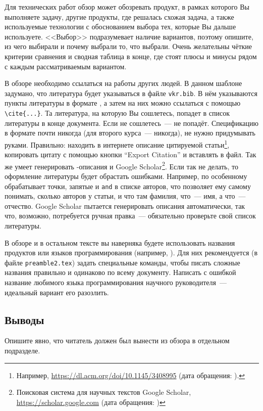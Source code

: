 Для технических работ обзор может обозревать продукт, в рамках которого Вы выполняете задачу, другие продукты, где решалась схожая задача, а также используемые технологии с обоснованием выбора тех, которые Вы дальше используете. <<Выбор>> подразумевает наличие вариантов, поэтому опишите, из чего выбирали и почему выбрали то, что выбрали. Очень желательны чёткие критерии сравнения и сводная таблица в конце, где стоят плюсы и минусы рядом с каждым рассматриваемым вариантом.

В обзоре необходимо ссылаться на работы других людей. В данном шаблоне задумано, что литература будет указываться в файле \verb=vkr.bib=. В нём указываются пункты литературы в формате \BibTeX{}, а затем на них можно ссылаться с помощью \verb=\cite{...}=. Та литература, на которую Вы сошлетесь, попадет в список литературы в конце документа. Если не сошлетесь~---  не попадёт. Спецификацию в формате \BibTeX{} почти никогда (для второго курса~--- никогда), не нужно придумывать руками. Правильно: находить в интернете описание цитируемой статьи\footnote{Например, \url{https://dl.acm.org/doi/10.1145/3408995} (дата обращения: ).},
копировать цитату с помощью кнопки \foreignquote{english}{Export Citation} и вставлять в \BibTeX{} файл. Так же умеет генерировать \BibTeX{}-описания и Google Scholar\footnote{Поисковая система для научных текстов Google Scholar, \url{https://scholar.google.com} (дата обращения: )}.
Если так не делать, то оформление литературы будет обрастать ошибками.
Например, \BibTeX{} по особенному обрабатывает точ\-ки, запятые и \verb=and= в списке авторов, что позволяет ему самому понимать, сколько авторов у статьи, и что там фамилия, что~--- имя, а что~--- отчество. Google Scholar пытается генерировать описания автоматически, так что, возможно, потребуется ручная правка~--- обязательно проверьте свой список литературы.

В обзоре и в остальном тексте вы наверняка будете использовать названия продуктов или языков программирования (например, \csharp{}).
Для них рекоменду\-ется (в файле \verb=preamble2.tex=) за\-дать специальные команды, чтобы писать сложные названия правильно и одинаково по всему доку\-менту.
Написать с ошибкой  название любимого языка программирова\-ния науч\-ного руко\-водителя~--- идеальный вариант его разозлить.

\subsection{Выводы}

Опишите явно, что читатель должен был вынести из обзора в отдельном подразделе.
